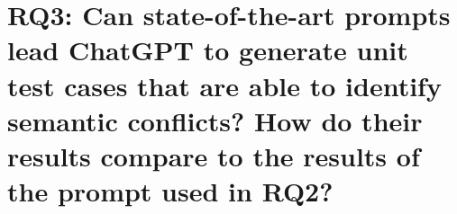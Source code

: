 \section{RQ3: Can state-of-the-art prompts lead ChatGPT to generate
unit test cases that are able to identify semantic conflicts?  How do their
results compare to the results of the prompt used in RQ2?}\label{sec:results:rq3}




